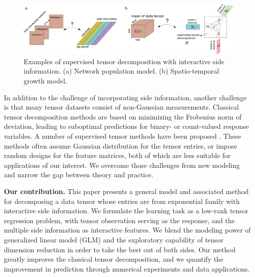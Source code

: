 \documentclass{article}
\theoremstyle{definition}
\theoremstyle{definition}
\begin{document}
 \begin{figure}[hbt]
 \vspace{-.4cm}
\begin{center}
\includegraphics[width = 13.5cm]{demo.pdf}
\vspace{-.4cm}
\end{center}
\caption{Examples of supervised tensor decomposition with interactive side information. (a) Network population model. (b) Spatio-temporal growth model.} \label{fig:intro1}
\vspace{-.2cm}
\end{figure}

In addition to the challenge of incorporating side information, another challenge is that many tensor datasets consist of non-Gaussian measurements. Classical tensor decomposition methods are based on minimizing the Frobenius norm of deviation, leading to suboptimal predictions for binary- or count-valued response variables. A number of supervised tensor methods have been proposed \citep{narita2012tensor, zhao2012higher, yu2016learning,lock2018supervised}. These methods often assume Gaussian distribution for the tensor entries, or impose random designs for the feature matrices, both of which are less suitable for applications of our interest. We overcome those challenges from new modeling and narrow the gap between theory and practice.

{\bf Our contribution.} This paper presents a general model and associated method for decomposing a data tensor whose entries are from exponential family with interactive side information. We formulate the learning task as a low-rank tensor regression problem, with tensor observation serving as the response, and the multiple side information as interactive features. We blend the modeling power of generalized linear model (GLM) and the exploratory capability of tensor dimension reduction in order to take the best out of both sides. Our method greatly improves the classical tensor decomposition, and we quantify the improvement in prediction through numerical experiments and data applications. 
\end{document}
